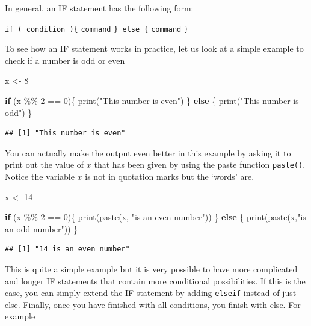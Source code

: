 \documentclass[
]{book}
\newenvironment{Shaded}{\begin{snugshade}}{\end{snugshade}}
\newcommand{\ControlFlowTok}[1]{\textcolor[rgb]{0.13,0.29,0.53}{\textbf{#1}}}
\newcommand{\DecValTok}[1]{\textcolor[rgb]{0.00,0.00,0.81}{#1}}
\newcommand{\FunctionTok}[1]{\textcolor[rgb]{0.00,0.00,0.00}{#1}}
\newcommand{\NormalTok}[1]{#1}
\newcommand{\OtherTok}[1]{\textcolor[rgb]{0.56,0.35,0.01}{#1}}
\newcommand{\SpecialCharTok}[1]{\textcolor[rgb]{0.00,0.00,0.00}{#1}}
\newcommand{\StringTok}[1]{\textcolor[rgb]{0.31,0.60,0.02}{#1}}
\theoremstyle{definition}
\theoremstyle{definition}
\theoremstyle{definition}
\theoremstyle{definition}
\theoremstyle{remark}
\begin{document}
In general, an IF statement has the following form:

\texttt{if\ (\ condition\ )\{}
\texttt{command}
\texttt{\}\ else\ \{}
\texttt{command}
\texttt{\}}

To see how an IF statement works in practice, let us look at a simple example to check if a number is odd or even

\begin{Shaded}
\begin{Highlighting}[]
\NormalTok{x }\OtherTok{\textless{}{-}} \DecValTok{8}

\ControlFlowTok{if}\NormalTok{ (x }\SpecialCharTok{\%\%} \DecValTok{2} \SpecialCharTok{==} \DecValTok{0}\NormalTok{)\{}
  \FunctionTok{print}\NormalTok{(}\StringTok{"This number is even"}\NormalTok{)}
\NormalTok{\} }\ControlFlowTok{else}\NormalTok{ \{ }
  \FunctionTok{print}\NormalTok{(}\StringTok{"This number is odd"}\NormalTok{)}
\NormalTok{\}}
\end{Highlighting}
\end{Shaded}

\begin{verbatim}
## [1] "This number is even"
\end{verbatim}

You can actually make the output even better in this example by asking it to print out the value of \(x\) that has been given by using the paste function \texttt{paste()}. Notice the variable \(x\) is not in quotation marks but the `words' are.

\begin{Shaded}
\begin{Highlighting}[]
\NormalTok{x }\OtherTok{\textless{}{-}} \DecValTok{14}
  
\ControlFlowTok{if}\NormalTok{ (x }\SpecialCharTok{\%\%} \DecValTok{2} \SpecialCharTok{==} \DecValTok{0}\NormalTok{)\{}
  \FunctionTok{print}\NormalTok{(}\FunctionTok{paste}\NormalTok{(x, }\StringTok{"is an even number"}\NormalTok{))}
\NormalTok{\} }\ControlFlowTok{else}\NormalTok{ \{ }
  \FunctionTok{print}\NormalTok{(}\FunctionTok{paste}\NormalTok{(x,}\StringTok{"is an odd number"}\NormalTok{))  }
\NormalTok{\}}
\end{Highlighting}
\end{Shaded}

\begin{verbatim}
## [1] "14 is an even number"
\end{verbatim}

This is quite a simple example but it is very possible to have more complicated and longer IF statements that contain more conditional possibilities. If this is the case, you can simply extend the IF statement by adding \texttt{elseif} instead of just else. Finally, once you have finished with all conditions, you finish with else. For example
\end{document}
